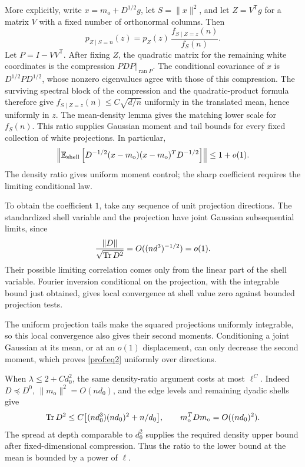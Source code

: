 More explicitly, write $x=m_{\mathrm o}+D^{1/2}g$, let
$S=\|x\|^2$, and let $Z=V^{\mathsf T}g$ for a matrix $V$ with a fixed
number of orthonormal columns. Then
\[
 p_{Z\mid S=n}(z)=p_Z(z)\,
       \frac{f_{S\mid Z=z}(n)}{f_S(n)}.
\]
Let $P=I-VV^{\mathsf T}$. After fixing $Z$, the quadratic matrix
for the remaining white coordinates is the compression
$\left.PDP\right|_{\operatorname{ran}P}$. The conditional covariance of
$x$ is $D^{1/2}PD^{1/2}$, whose nonzero eigenvalues agree with those of
this compression. The surviving spectral block of the compression and
the quadratic-product formula therefore give
$f_{S\mid Z=z}(n)\le C\sqrt{d/n}$ uniformly in the translated mean,
hence uniformly in $z$. The mean-density lemma gives the matching
lower scale for $f_S(n)$. This ratio supplies Gaussian moment and tail
bounds for every fixed collection of white projections. In particular,
\begin{equation}\label{prof:eq2}
 \left\|
 \mathbb E_{\mathrm{shell}}
 \left[D^{-1/2}(x-m_{\mathrm o})(x-m_{\mathrm o})^TD^{-1/2}\right]
 \right\|\le1+o(1).
\end{equation}
The density ratio gives uniform moment control; the sharp coefficient
requires the limiting conditional law.

To obtain the coefficient $1$,
take any sequence of unit projection directions.  The standardized shell variable and the projection have
joint Gaussian subsequential limits, since
\[
 \frac{\|D\|}{\sqrt{\operatorname{Tr} D^2}}
 =O((nd^3)^{-1/2})=o(1).
\]
Their possible limiting correlation comes only from the linear part
of the shell variable.  Fourier inversion conditional on the
projection, with the integrable bound just obtained, gives local
convergence at shell value zero against bounded projection tests.

The uniform projection tails make the squared projections uniformly
integrable, so this local convergence also gives their second moments.  Conditioning a
joint Gaussian at its mean, or at an $o(1)$ displacement, can only
decrease the second moment, which proves \eqref{prof:eq2} uniformly
over directions.

When $\lambda\le2+Cd_0^2$, the same density-ratio argument costs at
most $\ell^C$.  Indeed $D\preceq D^0$,
$\|m_{\mathrm o}\|^2=O(nd_0)$, and the edge levels and remaining
dyadic shells give
\[
 \operatorname{Tr} D^2\le
 C\bigl[(nd_0^3)(nd_0)^2+n/d_0\bigr],
 \qquad m_{\mathrm o}^TDm_{\mathrm o}=O((nd_0)^2).
\]
The spread at depth comparable to $d_0^2$ supplies the required
density upper bound after fixed-dimensional compression. Thus the
ratio to the lower bound at the mean is bounded by a power of $\ell$.

